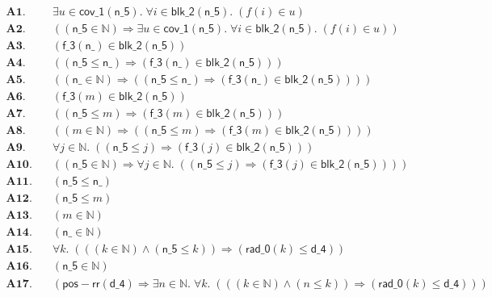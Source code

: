 \documentclass[11pt]{article}
\begin{document}
\begin{align*}
  \mathbf{A1.}\quad & \exists u \in \mathsf{cov\_1}(\mathsf{n\_5}).\; \forall i \in \mathsf{blk\_2}(\mathsf{n\_5}).\; (f(i) \in u) \\
  \mathbf{A2.}\quad & ((\mathsf{n\_5} \in \mathbb{N}) \Rightarrow \exists u \in \mathsf{cov\_1}(\mathsf{n\_5}).\; \forall i \in \mathsf{blk\_2}(\mathsf{n\_5}).\; (f(i) \in u)) \\
  \mathbf{A3.}\quad & (\mathsf{f\_3}(\mathsf{n\_}) \in \mathsf{blk\_2}(\mathsf{n\_5})) \\
  \mathbf{A4.}\quad & ((\mathsf{n\_5} \leq \mathsf{n\_}) \Rightarrow (\mathsf{f\_3}(\mathsf{n\_}) \in \mathsf{blk\_2}(\mathsf{n\_5}))) \\
  \mathbf{A5.}\quad & ((\mathsf{n\_} \in \mathbb{N}) \Rightarrow ((\mathsf{n\_5} \leq \mathsf{n\_}) \Rightarrow (\mathsf{f\_3}(\mathsf{n\_}) \in \mathsf{blk\_2}(\mathsf{n\_5})))) \\
  \mathbf{A6.}\quad & (\mathsf{f\_3}(m) \in \mathsf{blk\_2}(\mathsf{n\_5})) \\
  \mathbf{A7.}\quad & ((\mathsf{n\_5} \leq m) \Rightarrow (\mathsf{f\_3}(m) \in \mathsf{blk\_2}(\mathsf{n\_5}))) \\
  \mathbf{A8.}\quad & ((m \in \mathbb{N}) \Rightarrow ((\mathsf{n\_5} \leq m) \Rightarrow (\mathsf{f\_3}(m) \in \mathsf{blk\_2}(\mathsf{n\_5})))) \\
  \mathbf{A9.}\quad & \forall j \in \mathbb{N}.\; ((\mathsf{n\_5} \leq j) \Rightarrow (\mathsf{f\_3}(j) \in \mathsf{blk\_2}(\mathsf{n\_5}))) \\
  \mathbf{A10.}\quad & ((\mathsf{n\_5} \in \mathbb{N}) \Rightarrow \forall j \in \mathbb{N}.\; ((\mathsf{n\_5} \leq j) \Rightarrow (\mathsf{f\_3}(j) \in \mathsf{blk\_2}(\mathsf{n\_5})))) \\
  \mathbf{A11.}\quad & (\mathsf{n\_5} \leq \mathsf{n\_}) \\
  \mathbf{A12.}\quad & (\mathsf{n\_5} \leq m) \\
  \mathbf{A13.}\quad & (m \in \mathbb{N}) \\
  \mathbf{A14.}\quad & (\mathsf{n\_} \in \mathbb{N}) \\
  \mathbf{A15.}\quad & \forall k.\; (((k \in \mathbb{N}) \wedge (\mathsf{n\_5} \leq k)) \Rightarrow (\mathsf{rad\_0}(k) \leq \mathsf{d\_4})) \\
  \mathbf{A16.}\quad & (\mathsf{n\_5} \in \mathbb{N}) \\
  \mathbf{A17.}\quad & (\mathsf{pos{-}rr}(\mathsf{d\_4}) \Rightarrow \exists n \in \mathbb{N}.\; \forall k.\; (((k \in \mathbb{N}) \wedge (n \leq k)) \Rightarrow (\mathsf{rad\_0}(k) \leq \mathsf{d\_4}))) \\

\end{align*}
\end{document}
